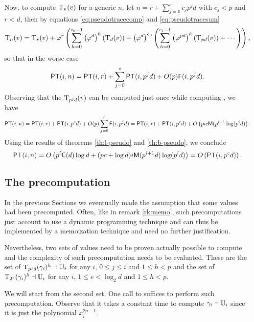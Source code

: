 Now, to compute $\operatorname{T}_n(v)$ for a generic $n$, let $n = r +
\sum_{j=0}^{c}c_jp^jd$ with $c_j<p$ and $r<d$, then by equations
\eqref{eq:pseudotracecomp} and \eqref{eq:pseudotracesum}
\begin{equation*}
  \operatorname{T}_n(v) =
  \operatorname{T}_r(v) + \varphi^r\left(
  \sum_{h=0}^{c_0-1}\left(\varphi^{d}\right)^h(\operatorname{T}_d(v)) + \left(\varphi^d\right)^{c_0}\left(
  \sum_{h=0}^{c_1-1}\left(\varphi^{pd}\right)^h(\operatorname{T}_{pd}(v)) + \cdots
  \right)
  \right)
  \text{,}
\end{equation*}
so that in the worse case
\begin{equation*}
  \mathrm{\sf PT}(i,n) = \mathrm{\sf PT}(i,r) + \sum_{j=0}^c \mathrm{\sf PT}(i,p^jd) + O(p)\mathrm{\sf F}(i,p^jd)
  \text{.}
\end{equation*}
Observing that the $\operatorname{T}_{p^jd}(v)$ can be computed just once while
computing , we have
\begin{multline*}
  \mathrm{\sf PT}(i,n) = \mathrm{\sf PT}(i,r) + \mathrm{\sf PT}(i,p^cd) + O(p)\sum_{j=0}^c \mathrm{\sf F}(i,p^jd) =
  \mathrm{\sf PT}(i,r) + \mathrm{\sf PT}(i,p^cd) + O\left(pic\mathrm{\sf M}(p^{i+1}\log(p^id)\right)
  \text{.}
\end{multline*}
Using the results of theorems \ref{th:l-pseudo} and \ref{th:b-pseudo},
we conclude
\begin{equation*}
  \mathrm{\sf PT}(i,n) = O\left(p^i\mathrm{\sf C}(d)\log d +
  (pc +\log d)i\mathrm{\sf M}(p^{i+1}d)\log(p^id)\right) =
  O\left( \mathrm{\sf PT}(i, p^cd) \right) \text{.}
\end{equation*}



\subsection{The precomputation}
\label{sec:pseudotrace-frobenius:precomputation}
In the previous Sections we eventually made the assumption that some
values had been precomputed. Often, like in remark \ref{rk:memo}, such
precomputations just account to use a dynamic programming technique
and can thus be implemented by a memoization technique and need no
further justification.

Nevertheless, two sets of values need to be proven actually possible
to compute and the complexity of such precomputation needs to be
evaluated. These are the set of ${\operatorname{T}_{p^jd}(\gamma_i)^h\dashv\mathbb{U}_i}$
for any $i$, $0\le j\le i$ and $1\le h < p$ and the set of
$\operatorname{T}_{2^e}(\gamma_i)^h\dashv\mathbb{U}_i$ for any $i$, $1\le e < \log_2d$ and
$1\le h <p$.

We will start from the second set. One call to  suffices to perform
such precomputation. Observe that it takes a constant time to compute
$\gamma_i\dashv\mathbb{U}_i$ since it is just the polynomial $x_i^{2p-1}$.

